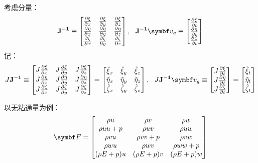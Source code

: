 \documentclass[UTF8,zihao=5]{ctexart} %
\newcommand{\bm}[1]{{\mathbf{#1}}}
\newcommand*{\pd}[2]{\frac{\partial #1}{\partial #2}}
\begin{document}
考虑分量：
$$
    \bm{J^{-1}}\equiv\begin{bmatrix}
        \pd{\xi}{x}   & \pd{\xi}{y}   & \pd{\xi}{z}   \\
        \pd{\eta}{x}  & \pd{\eta}{y}  & \pd{\eta}{z}  \\
        \pd{\zeta}{x} & \pd{\zeta}{y} & \pd{\zeta}{z} \\
    \end{bmatrix}, \ \
    \bm{J^{-1}}\vg\equiv \begin{bmatrix}
        \pd{\xi}{t}   \\
        \pd{\eta}{t}  \\
        \pd{\zeta}{t} \\
    \end{bmatrix}
$$
记：
$$
    J\bm{J^{-1}}\equiv\begin{bmatrix}
        J\pd{\xi}{x}   & J\pd{\xi}{y}   & J\pd{\xi}{z}   \\
        J\pd{\eta}{x}  & J\pd{\eta}{y}  & J\pd{\eta}{z}  \\
        J\pd{\zeta}{x} & J\pd{\zeta}{y} & J\pd{\zeta}{z} \\
    \end{bmatrix}
    =
    \begin{bmatrix}
        \hat{\xi}_x   & \hat{\xi}_y   & \hat{\xi}_z   \\
        \hat{\eta}_x  & \hat{\eta}_y  & \hat{\eta}_z  \\
        \hat{\zeta}_x & \hat{\zeta}_y & \hat{\zeta}_z \\
    \end{bmatrix},\ \
    J\bm{J^{-1}}\vg\equiv \begin{bmatrix}
        J\pd{\xi}{t}   \\
        J\pd{\eta}{t}  \\
        J\pd{\zeta}{t} \\
    \end{bmatrix}=
    \begin{bmatrix}
        \hat{\xi}_t   \\
        \hat{\eta}_t  \\
        \hat{\zeta}_t \\
    \end{bmatrix}
$$

以无粘通量为例：
$$
    \F
    =
    \begin{bmatrix}
        \rho u        & \rho v        & \rho w        \\
        \rho uu + p   & \rho uv       & \rho uw       \\
        \rho vu       & \rho vv + p   & \rho vw       \\
        \rho wu       & \rho wv       & \rho ww + p   \\
        (\rho E + p)u & (\rho E + p)v & (\rho E + p)w \\
    \end{bmatrix}
$$
\end{document}
